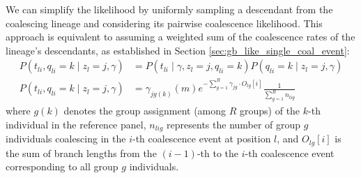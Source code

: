 We can simplify the likelihood by uniformly sampling a descendant from the coalescing lineage and considering its pairwise coalescence likelihood. This approach is equivalent to assuming a weighted sum of the coalescence rates of the lineage's descendants, as established in Section \ref{sec:gb_like_single_coal_event}:
\begin{align}
    P(t_{li}, q_{li} = k \mid z_l = j, \gamma) &= P(t_{li} \mid \gamma, z_l = j, q_{li} = k) P(q_{li} = k \mid z_l = j, \gamma) \nonumber \\
    P(t_{li}, q_{li} = k \mid z_l = j, \gamma) &= \gamma_{jg(k)}(m)e^{-\sum_{g=1}^R \gamma_{jg} \cdot O_{lg}[i]} \frac{1}{\sum_{g=1}^R n_{lig}}
\end{align}
where \( g(k) \) denotes the group assignment (among \( R \) groups) of the \( k \)-th individual in the reference panel, \( n_{lig} \) represents the number of group \( g \) individuals coalescing in the \( i \)-th coalescence event at position \( l \), and \( O_{lg}[i] \) is the sum of branch lengths from the \((i-1)\)-th to the \( i \)-th coalescence event corresponding to all group \( g \) individuals.

